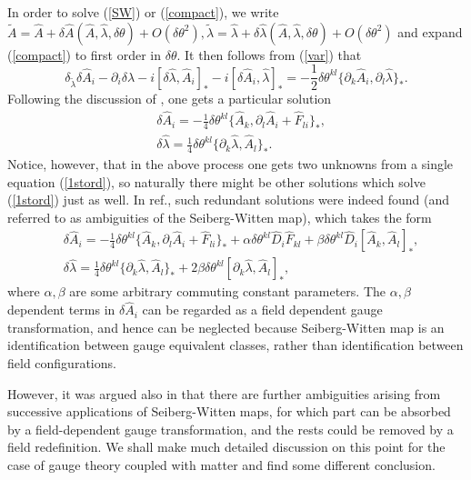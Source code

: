 \documentclass[a4paper,a4paper]{article}%
\begin{document}
In order to solve (\ref{SW}) or (\ref{compact}), we write
$\tilde{A}=\hat{A}+\delta\hat{A}(\hat{A},\hat{\lambda},\delta\theta
)+O(\delta\theta^{2}),\tilde{\lambda}=\hat{\lambda}+\delta\hat{\lambda
}(\hat{A},\hat{\lambda},\delta\theta)+O(\delta\theta^{2})$ and expand
(\ref{compact}) to first order in $\delta\theta$. It then follows from
(\ref{var}) that
\begin{equation}
\delta_{\tilde{\lambda}}\delta\hat{A}_{i}-\partial_{i}\delta\hat{\lambda
}-i[\delta\hat{\lambda},\hat{A}_{i}]_{\ast}-i[\delta\hat{A}_{i},\hat{\lambda
}]_{\ast}=-\frac{1}{2}\delta\theta^{kl}\{\partial_{k}\hat{A}_{i},\partial
_{l}\hat{\lambda}\}_{\ast}. \label{1stord}%
\end{equation}
Following the discussion of \cite{6}, one gets a particular solution%
\begin{align}
&  \delta\hat{A}_{i}=-\frac{1}{4}\delta\theta^{kl}\{\hat{A}_{k},\partial
_{l}\hat{A}_{i}+\hat{F}_{li}\}_{\ast},\nonumber\\
&  \delta\hat{\lambda}=\frac{1}{4}\delta\theta^{kl}\{\partial_{k}\hat{\lambda
},\hat{A}_{l}\}_{\ast}. \label{par}%
\end{align}
Notice, however, that in the above process one gets two unknowns from a single
equation (\ref{1stord}), so naturally there might be other solutions which
solve (\ref{1stord}) just as well. In ref.\cite{13}, such redundant solutions
were indeed found (and referred to as ambiguities of the Seiberg-Witten map),
which takes the form%
\begin{align}
&  \delta\hat{A}_{i}=-\frac{1}{4}\delta\theta^{kl}\{\hat{A}_{k},\partial
_{l}\hat{A}_{i}+\hat{F}_{li}\}_{\ast}+\alpha\delta\theta^{kl}\hat{D}_{i}%
\hat{F}_{kl}+\beta\delta\theta^{kl}\hat{D}_{i}[\hat{A}_{k},\hat{A}_{l}]_{\ast
},\nonumber\\
&  \delta\hat{\lambda}=\frac{1}{4}\delta\theta^{kl}\{\partial_{k}\hat{\lambda
},\hat{A}_{l}\}_{\ast}+2\beta\delta\theta^{kl}[\partial_{k}\hat{\lambda
},\hat{A}_{l}]_{\ast}, \label{ambia}%
\end{align}
where $\alpha,\beta$ are some arbitrary commuting constant parameters. The
$\alpha,\beta$ dependent terms in $\delta\hat{A}_{i}$ can be regarded as a
field dependent gauge transformation, and hence can be neglected because
Seiberg-Witten map is an identification between gauge equivalent classes,
rather than identification between field configurations.

However, it was argued also in \cite{13} that there are further ambiguities
arising from successive applications of Seiberg-Witten maps, for which part
can be absorbed by a field-dependent gauge transformation, and the rests could
be removed by a field redefinition. We shall make much detailed discussion on
this point for the case of gauge theory coupled with matter and find some
different conclusion.
\end{document}

